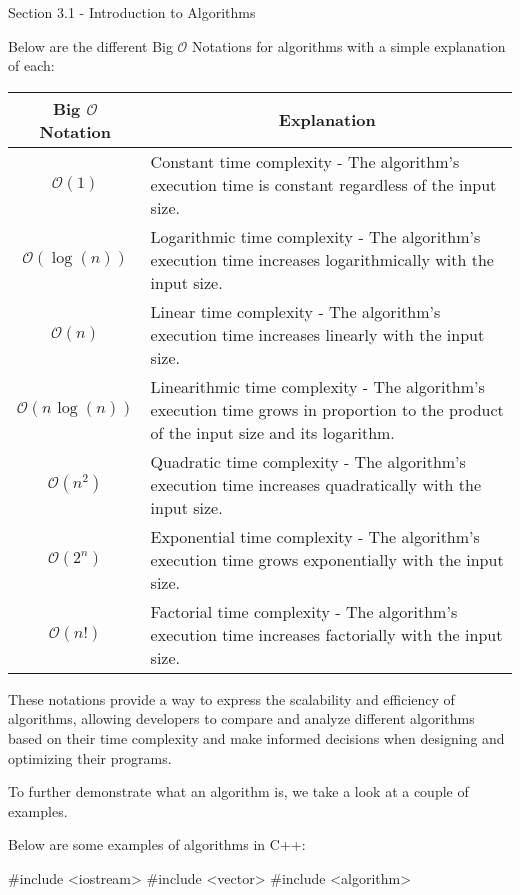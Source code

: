 \begin{notes}{Section 3.1 - Introduction to Algorithms}
    \begin{highlight}
        Below are the different Big $\mathcal{O}$ Notations for algorithms with a simple explanation of each: \\
        \begin{center}
            \begin{tabular}{|c|p{12cm}|}
                \hline \textbf{Big $\mathcal{O}$ Notation} & \multicolumn{1}{|c|}{\textbf{Explanation}} \\ \hline
                $\mathcal{O}(1)$ & Constant time complexity - The algorithm's execution time is constant regardless of the input size. \\ \hline
                $\mathcal{O}(\log{(n)})$ & Logarithmic time complexity - The algorithm's execution time increases logarithmically with the input size. \\ \hline
                $\mathcal{O}(n)$ & Linear time complexity - The algorithm's execution time increases linearly with the input size. \\ \hline
                $\mathcal{O}(n\hspace{1pt}\log{(n)})$ & Linearithmic time complexity - The algorithm's execution time grows in proportion to the product of the input size and its logarithm. \\ \hline
                $\mathcal{O}(n^{2})$ & Quadratic time complexity - The algorithm's execution time increases quadratically with the input size. \\ \hline
                $\mathcal{O}(2^{n})$ & Exponential time complexity - The algorithm's execution time grows exponentially with the input size. \\ \hline
                $\mathcal{O}(n!)$ & 	Factorial time complexity - The algorithm's execution time increases factorially with the input size. \\ \hline
            \end{tabular}
        \end{center}
        These notations provide a way to express the scalability and efficiency of algorithms, allowing developers to compare and analyze different algorithms based on their time complexity and make informed decisions when designing and optimizing their programs.
    \end{highlight}
    
    To further demonstrate what an algorithm is, we take a look at a couple of examples.
    
    \begin{highlight}
        Below are some examples of algorithms in C++:
    \begin{code}[C++]
    #include <iostream>
    #include <vector>
    #include <algorithm>


\end{code}
\end{highlight}
\end{notes}

